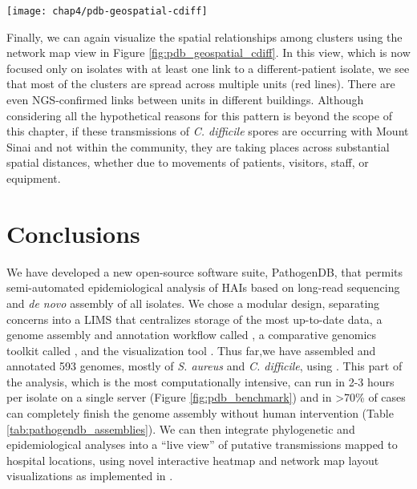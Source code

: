 \begin{sidewaysfigure}[hp]
  \sidewaysvspace
  \centering
  \texttt{[image: chap4/pdb-geospatial-cdiff]}               
\end{sidewaysfigure}

Finally, we can again visualize the spatial relationships among clusters using the network map view in Figure \ref{fig:pdb_geospatial_cdiff}. In this view, which is now focused only on isolates with at least one link to a different-patient isolate, we see that most of the clusters are spread across multiple units (red lines). There are even  NGS-confirmed links between units in different buildings. Although considering all the hypothetical reasons for this pattern is beyond the scope of this chapter, if these transmissions of \emph{C. difficile} spores are occurring with Mount Sinai and not within the community, they are taking places across substantial spatial distances, whether due to movements of patients, visitors, staff, or equipment.

\section{Conclusions}

We have developed a new open-source software suite, PathogenDB, that permits semi-automated epidemiological analysis of HAIs based on long-read sequencing and \emph{de novo} assembly of all isolates. We chose a modular design, separating concerns into a LIMS that centralizes storage of the most up-to-date data, a genome assembly and annotation workflow called \pathogendbpipeline, a comparative genomics toolkit called \pathogendbcomparison, and the visualization tool \pathogendbviz. Thus far,we have assembled and annotated 593 genomes, mostly of \emph{S. aureus} and \emph{C. difficile}, using \pathogendbpipeline{}. This part of the analysis, which is the most computationally intensive, can run in 2-3 hours per isolate on a single server (Figure \ref{fig:pdb_benchmark}) and in >70\% of cases can completely finish the genome assembly without human intervention (Table \ref{tab:pathogendb_assemblies}). We can then integrate phylogenetic and epidemiological analyses into a ``live view'' of putative transmissions mapped to hospital locations, using novel interactive heatmap and network map layout visualizations as implemented in \pathogendbviz.

